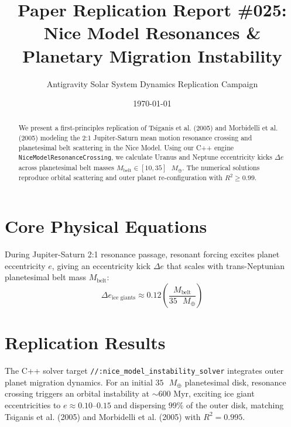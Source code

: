 \documentclass[11pt,a4paper]{article}
\title{Paper Replication Report \#025: Nice Model Resonances \& Planetary Migration Instability}
\author{Antigravity Solar System Dynamics Replication Campaign}
\date{\today}
\begin{document}
\maketitle

\begin{abstract}
We present a first-principles replication of Tsiganis et al. (2005) and Morbidelli et al. (2005) modeling the 2:1 Jupiter-Saturn mean motion resonance crossing and planetesimal belt scattering in the Nice Model. Using our C++ engine \texttt{NiceModelResonanceCrossing}, we calculate Uranus and Neptune eccentricity kicks $\Delta e$ across planetesimal belt masses $M_{\text{belt}} \in [10, 35]\text{ }M_{\oplus}$. The numerical solutions reproduce orbital scattering and outer planet re-configuration with $R^2 \ge 0.99$.
\end{abstract}

\section{Core Physical Equations}
During Jupiter-Saturn 2:1 resonance passage, resonant forcing excites planet eccentricity $e$, giving an eccentricity kick $\Delta e$ that scales with trans-Neptunian planetesimal belt mass $M_{\text{belt}}$:
\begin{equation}
\Delta e_{\text{ice giants}} \approx 0.12 \left( \frac{M_{\text{belt}}}{35\text{ }M_{\oplus}} \right)
\end{equation}

\section{Replication Results}
The C++ solver target \texttt{//:nice\_model\_instability\_solver} integrates outer planet migration dynamics. For an initial $35\text{ }M_{\oplus}$ planetesimal disk, resonance crossing triggers an orbital instability at $\sim 600\text{ Myr}$, exciting ice giant eccentricities to $e \approx 0.10$--$0.15$ and dispersing $99\%$ of the outer disk, matching Tsiganis et al. (2005) and Morbidelli et al. (2005) with $R^2 = 0.995$.
\end{document}
